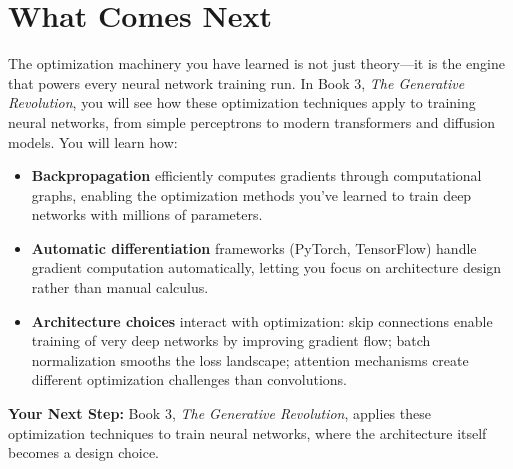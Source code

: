\documentclass[../../editions/book2-optimization/main.tex]{subfiles}
\begin{document}
\section*{What Comes Next}

The optimization machinery you have learned is not just theory---it is the engine that powers every neural network training run. In Book 3, \textit{The Generative Revolution}, you will see how these optimization techniques apply to training neural networks, from simple perceptrons to modern transformers and diffusion models. You will learn how:

\begin{itemize}
    \item \textbf{Backpropagation} efficiently computes gradients through computational graphs, enabling the optimization methods you've learned to train deep networks with millions of parameters.
    \item \textbf{Automatic differentiation} frameworks (PyTorch, TensorFlow) handle gradient computation automatically, letting you focus on architecture design rather than manual calculus.
    \item \textbf{Architecture choices} interact with optimization: skip connections enable training of very deep networks by improving gradient flow; batch normalization smooths the loss landscape; attention mechanisms create different optimization challenges than convolutions.
\end{itemize}

\begin{keyconcept}
\textbf{Your Next Step:}
Book 3, \textit{The Generative Revolution}, applies these optimization techniques to train neural networks, where the architecture itself becomes a design choice.
\end{keyconcept}
\end{document}
